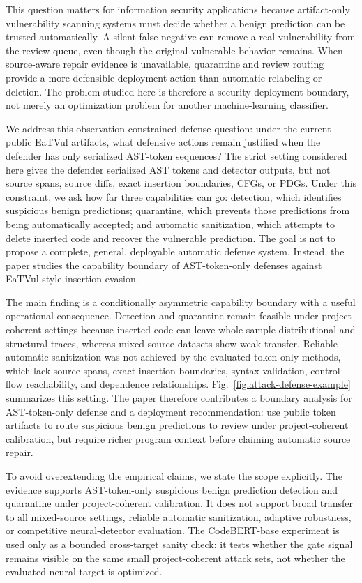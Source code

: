\documentclass[letterpaper,twocolumn,10pt,twoside]{article}
\begin{document}
This question matters for information security applications because artifact-only vulnerability scanning systems must decide whether a benign prediction can be trusted automatically. A silent false negative can remove a real vulnerability from the review queue, even though the original vulnerable behavior remains. When source-aware repair evidence is unavailable, quarantine and review routing provide a more defensible deployment action than automatic relabeling or deletion. The problem studied here is therefore a security deployment boundary, not merely an optimization problem for another machine-learning classifier.

We address this observation-constrained defense question: under the current public EaTVul artifacts, what defensive actions remain justified when the defender has only serialized AST-token sequences? The strict setting considered here gives the defender serialized AST tokens and detector outputs, but not source spans, source diffs, exact insertion boundaries, CFGs, or PDGs. Under this constraint, we ask how far three capabilities can go: detection, which identifies suspicious benign predictions; quarantine, which prevents those predictions from being automatically accepted; and automatic sanitization, which attempts to delete inserted code and recover the vulnerable prediction. The goal is not to propose a complete, general, deployable automatic defense system. Instead, the paper studies the capability boundary of AST-token-only defenses against EaTVul-style insertion evasion.

The main finding is a conditionally asymmetric capability boundary with a useful operational consequence. Detection and quarantine remain feasible under project-coherent settings because inserted code can leave whole-sample distributional and structural traces, whereas mixed-source datasets show weak transfer. Reliable automatic sanitization was not achieved by the evaluated token-only methods, which lack source spans, exact insertion boundaries, syntax validation, control-flow reachability, and dependence relationships. Fig.~\ref{fig:attack-defense-example} summarizes this setting. The paper therefore contributes a boundary analysis for AST-token-only defense and a deployment recommendation: use public token artifacts to route suspicious benign predictions to review under project-coherent calibration, but require richer program context before claiming automatic source repair.

To avoid overextending the empirical claims, we state the scope explicitly. The evidence supports AST-token-only suspicious benign prediction detection and quarantine under project-coherent calibration. It does not support broad transfer to all mixed-source settings, reliable automatic sanitization, adaptive robustness, or competitive neural-detector evaluation. The CodeBERT-base experiment is used only as a bounded cross-target sanity check: it tests whether the gate signal remains visible on the same small project-coherent attack sets, not whether the evaluated neural target is optimized.
\end{document}
